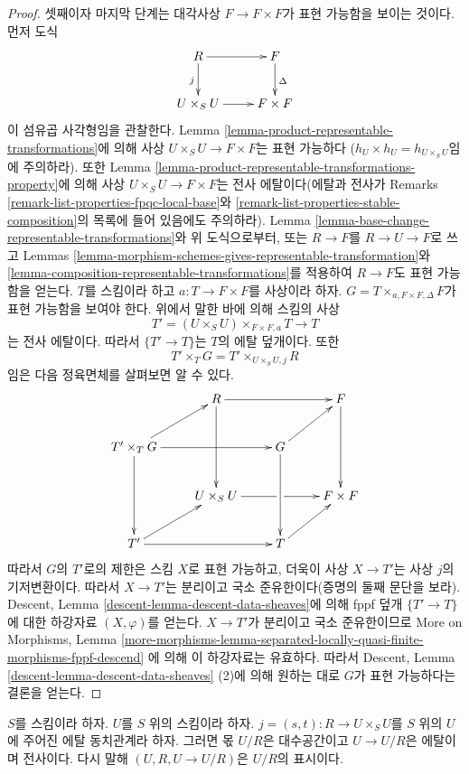 \begin{proof}
\medskip\noindent
셋째이자 마지막 단계는 대각사상 $F \to F \times F$가 표현 가능함을
보이는 것이다. 먼저 도식
$$
\xymatrix{
R \ar[r] \ar[d]_j & F \ar[d]^\Delta \\
U \times_S U \ar[r] & F \times F
}
$$
이 섬유곱 사각형임을 관찰한다. Lemma
\ref{lemma-product-representable-transformations}에 의해 사상
$U \times_S U \to F \times F$는 표현 가능하다
($h_U \times h_U = h_{U \times_S U}$임에 주의하라). 또한 Lemma
\ref{lemma-product-representable-transformations-property}에 의해
사상 $U \times_S U \to F \times F$는 전사 에탈이다(에탈과 전사가
Remarks \ref{remark-list-properties-fpqc-local-base}와
\ref{remark-list-properties-stable-composition}의 목록에 들어 있음에도
주의하라). Lemma \ref{lemma-base-change-representable-transformations}와
위 도식으로부터, 또는 $R \to F$를 $R \to U \to F$로 쓰고 Lemmas
\ref{lemma-morphism-schemes-gives-representable-transformation}와
\ref{lemma-composition-representable-transformations}를 적용하여
$R \to F$도 표현 가능함을 얻는다. $T$를 스킴이라 하고
$a : T \to F \times F$를 사상이라 하자.
$G = T \times_{a, F \times F, \Delta} F$가 표현 가능함을 보여야 한다.
위에서 말한 바에 의해 스킴의 사상
$$
T' = (U \times_S U) \times_{F \times F, a} T \longrightarrow T
$$
는 전사 에탈이다. 따라서 $\{T' \to T\}$는 $T$의 에탈 덮개이다.
또한
$$
T' \times_T G = T' \times_{U \times_S U, j} R
$$
임은 다음 정육면체를 살펴보면 알 수 있다.
$$
\xymatrix{
& R \ar[rr] \ar[dd] & & F \ar[dd] \\
T' \times_T G \ar[rr] \ar[dd] \ar[ru] & & G \ar[dd] \ar[ru] & \\
& U \times_S U \ar'[r][rr] & & F \times F \\
T' \ar[rr] \ar[ru] & & T \ar[ru]
}
$$
따라서 $G$의 $T'$로의 제한은 스킴 $X$로 표현 가능하고, 더욱이 사상
$X \to T'$는 사상 $j$의 기저변환이다. 따라서 $X \to T'$는 분리이고
국소 준유한이다(증명의 둘째 문단을 보라). Descent, Lemma
\ref{descent-lemma-descent-data-sheaves}에 의해 fppf 덮개
$\{T' \to T\}$에 대한 하강자료 $(X, \varphi)$를 얻는다.
$X \to T'$가 분리이고 국소 준유한이므로 More on Morphisms, Lemma
\ref{more-morphisms-lemma-separated-locally-quasi-finite-morphisms-fppf-descend}
에 의해 이 하강자료는 유효하다. 따라서 Descent, Lemma
\ref{descent-lemma-descent-data-sheaves} (2)에 의해 원하는 대로
$G$가 표현 가능하다는 결론을 얻는다.
\end{proof}

\begin{theorem}
\label{theorem-presentation}
$S$를 스킴이라 하자. $U$를 $S$ 위의 스킴이라 하자.
$j = (s, t) : R \to U \times_S U$를 $S$ 위의 $U$에 주어진 에탈
동치관계라 하자. 그러면 몫 $U/R$은 대수공간이고
$U \to U/R$은 에탈이며 전사이다. 다시 말해
$(U, R, U \to U/R)$은 $U/R$의 표시이다.
\end{theorem}

